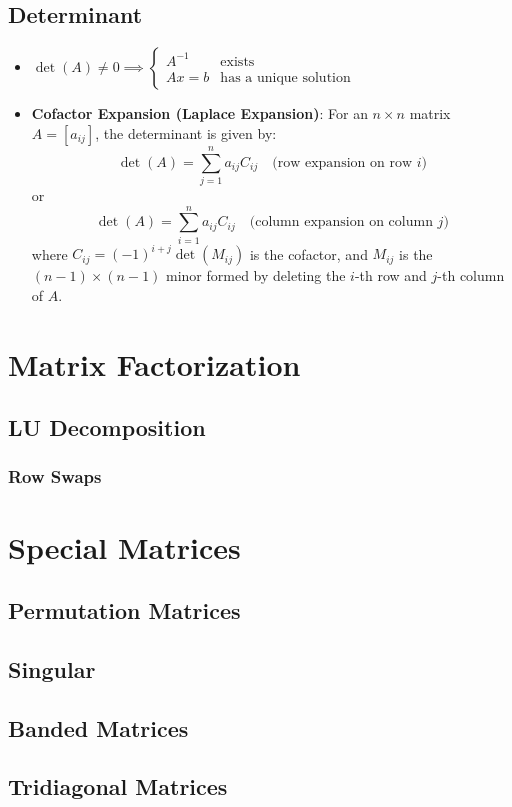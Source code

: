 \documentclass[8pt, letterpaper]{extarticle}
\begin{document}
\begin{multicols*}{3}
  \subsection{Determinant}
  \begin{itemize}
    \item $\det(A) \neq 0 \implies \begin{cases}
        A^{-1} & \text{exists} \\
        Ax = b & \text{has a unique solution}
      \end{cases}$
    \item \textbf{Cofactor Expansion (Laplace Expansion)}:  
      For an $n \times n$ matrix $A = [a_{ij}]$, the determinant is given by:
      \[
        \det(A) = \sum_{j=1}^{n} a_{ij} C_{ij} \quad \text{(row expansion on row $i$)}
      \]
      or
      \[
        \det(A) = \sum_{i=1}^{n} a_{ij} C_{ij} \quad \text{(column expansion on column $j$)}
      \]
      where $C_{ij} = (-1)^{i+j} \det(M_{ij})$ is the cofactor, and $M_{ij}$ is the $(n-1) \times (n-1)$ minor formed by deleting the $i$-th row and $j$-th column of $A$.
  \end{itemize}

  \section{Matrix Factorization}
  \subsection{LU Decomposition}
  \subsubsection{Row Swaps}
  \section{Special Matrices}
  \subsection{Permutation Matrices}
  \subsection{Singular}
  \subsection{Banded Matrices}
  \subsection{Tridiagonal Matrices}

\end{multicols*}
\end{document}
